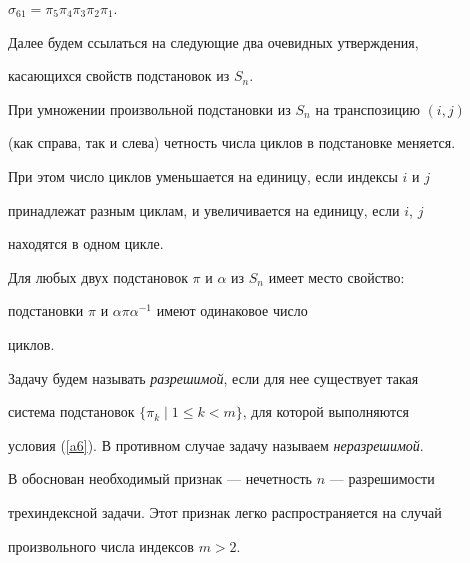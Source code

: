 $\sigma_{61}=\pi_{5} \pi_{4} \pi_{3} \pi_{2} \pi_{1}$.





Далее будем ссылаться на следующие два очевидных утверждения,


касающихся свойств подстановок из $S_n$.





\begin{note}


\label{n1}


При умножении произвольной подстановки из $S_n$ на транспозицию $(i,j)$


(как справа, так и слева) четность числа циклов в подстановке меняется.


При этом число циклов уменьшается на единицу, если индексы $i$ и $j$


принадлежат разным циклам, и увеличивается на единицу, если $i$, $j$


находятся в одном цикле.


\end{note}





\begin{note}


\label{n2}


Для любых двух подстановок $\pi$ и $\alpha$ из $S_n$ имеет место свойство:


подстановки $\pi$ и $\alpha \pi \alpha^{-1}$ имеют одинаковое число


циклов.


\end{note}





Задачу будем называть {\em разрешимой}, если для нее существует такая


система подстановок $\{\pi_k\mid1\le k < m \}$, для которой выполняются


условия (\ref{a6}). В противном случае задачу называем {\em неразрешимой}.


В \cite{GS} обоснован необходимый признак --- нечетность $n$ --- разрешимости


трехиндексной задачи. Этот признак легко распространяется на случай


произвольного числа индексов $m>2$.





